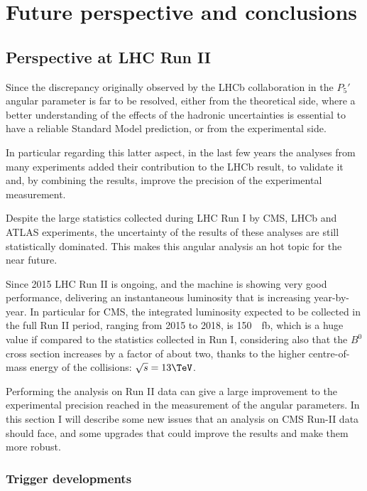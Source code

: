 \chapter{Future perspective and conclusions}
\label{sec:FutConcl}

\section{Perspective at LHC Run II}
\label{sec:Future}
Since the discrepancy originally observed by the LHCb collaboration in the $P_5'$ angular parameter is far to be resolved, either from the theoretical side, where a better understanding of the effects of the hadronic uncertainties is essential to have a reliable Standard Model prediction, or from the experimental side.

In particular regarding this latter aspect, in the last few years the analyses from many experiments added their contribution to the LHCb result, to validate it and, by combining the results, improve the precision of the experimental measurement.

Despite the large statistics collected during LHC Run I by CMS, LHCb and ATLAS experiments, the uncertainty of the results of these analyses are still statistically dominated.
This makes this angular analysis an hot topic for the near future.

Since 2015 LHC Run II is ongoing, and the machine is showing very good performance, delivering an instantaneous luminosity that is increasing year-by-year.
In particular for CMS, the integrated luminosity expected to be collected in the full Run II period, ranging from 2015 to 2018, is \SI{150}{\per\femto\barn}, which is a huge value if compared to the statistics collected in Run I, considering also that the $B^0$ cross section increases by a factor of about two, thanks to the higher centre-of-mass energy of the collisions: $\sqrt{s}=13\TeV$.

Performing the analysis on Run II data can give a large improvement to the experimental precision reached in the measurement of the angular parameters.
In this section I will describe some new issues that an analysis on CMS Run-II data should face, and some upgrades that could improve the results and make them more robust.

\subsection{Trigger developments}
\label{sec:TrigDeve}

